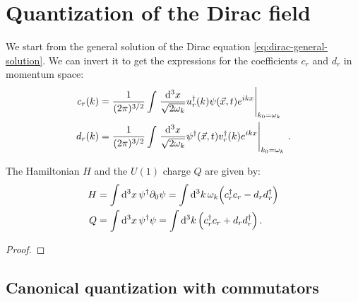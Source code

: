 \documentclass[main.tex]{subfiles}
\begin{document}
\section{Quantization of the Dirac field}


We start from the general solution of the Dirac equation \eqref{eq:dirac-general-solution}. We can invert it to get the expressions for the coefficients \(c_r\) and \(d_r\) in momentum space: 
%
\begin{subequations}
\begin{align}
c_r (k) &= \frac{1}{(2\pi )^{3/2}} \int \eval{\frac{ \dd[3]{x}}{\sqrt{2 \omega_{k}}} 
u_{r} ^\dag (k) \psi (\vec{x}, t) e^{ikx}}_{k_0 = \omega_{k}}  \\
d_r (k) &= \frac{1}{(2\pi )^{3/2}} \int \eval{\frac{ \dd[3]{x}}{\sqrt{2 \omega_{k}}} 
\psi ^\dag (\vec{x}, t) v_{r} ^\dag (k)  e^{ikx}}_{k_0 = \omega_{k}}
\,.
\end{align}
\end{subequations}

\begin{claim}
The Hamiltonian \(H\) and the \(U(1)\) charge \(Q\) are given by:
%
\begin{subequations}
\begin{align}
    H &= \int \dd[3]{x} \psi ^\dag \partial_0 \psi  = \int \dd[3]{k} \omega_{k} \qty(c_r ^\dag c_r - d_r  d_r ^\dag)  \\
    Q &= \int \dd[3]{x} \psi ^\dag \psi = \int \dd[3]{k} \qty(c_r ^\dag c_r  + d_r d_r ^\dag) 
    \,.
\end{align}   
\end{subequations}
\end{claim}

\begin{proof}
\end{proof}

\subsection{Canonical quantization with commutators}
\end{document}
